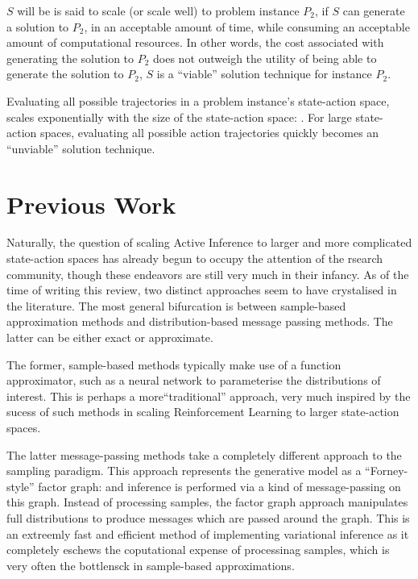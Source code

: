 \documentclass[onecolumn]{IEEEtran}
\begin{document}
$S$ will be is said to scale (or scale well) to problem instance $P_2$, if $S$ can generate a solution to $P_2$, in an acceptable amount of time, while consuming an acceptable amount of computational resources. In other words, the cost associated with generating the solution to $P_2$ does not outweigh the utility of being able to generate the solution to $P_2$, $S$ is a ``viable'' solution technique for instance $P_2$. 

Evaluating all possible trajectories in a problem instance's state-action space, scales exponentially with the size of the state-action space: \textcite{Applications-of-FEP-Machine-Learning-Neuroscience}. For large state-action spaces, evaluating all possible action trajectories quickly becomes an ``unviable'' solution technique.


\section{Previous Work}

Naturally, the question of scaling Active Inference to larger and more complicated state-action spaces has already begun to occupy the attention of the rsearch community, though these endeavors are still very much in their infancy. As of the time of writing this review, two distinct approaches seem to have crystalised in the literature. The most general bifurcation is between sample-based approximation methods and distribution-based message passing methods. The latter can be either exact or approximate.

The former, sample-based methods typically make use of a function approximator, such as a neural network to parameterise the distributions of interest. This is perhaps a more``traditional'' approach, very much inspired by the sucess of such methods in scaling Reinforcement Learning to larger state-action spaces.

The latter message-passing methods take a completely different approach to the sampling paradigm. This approach represents the generative model as a ``Forney-style'' factor graph: \textcite{Codes-on-Graphs} and inference is performed via a kind of message-passing on this graph.  
Instead of processing samples, the factor graph approach manipulates full distributions to produce messages which are passed around the graph. This is an extreemly fast and efficient method of implementing variational inference as it completely eschews the coputational expense of processinag samples, which is very often the bottlensck in sample-based approximations. 
\end{document}
